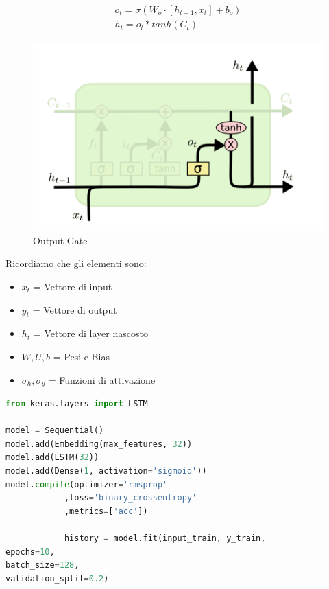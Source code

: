 \begin{itemize}
          \begin{equation}
              \begin{aligned}
                  o_t = \sigma(W_o \cdot [h_{t-1}, x_t] + b_o) \\
                  h_t = o_t * tanh(C_t)
              \end{aligned}
          \end{equation}
          \begin{figure}[H]
              \begin{center}
                  \includegraphics[scale=0.8]{images/outputgate.png}
              \end{center}
              \caption{Output Gate}
          \end{figure}

\end{itemize}

Ricordiamo che gli elementi sono:
\begin{itemize}
    \item $x_t$ = Vettore di input
    \item $y_t$ = Vettore di output
    \item $h_t$ = Vettore di layer nascosto
    \item $W,U,b$ = Pesi e Bias
    \item $\sigma_h, \sigma_y$ = Funzioni di attivazione
\end{itemize}

\begin{lstlisting}[language=python]
from keras.layers import LSTM

model = Sequential()
model.add(Embedding(max_features, 32))
model.add(LSTM(32))
model.add(Dense(1, activation='sigmoid'))
model.compile(optimizer='rmsprop'
            ,loss='binary_crossentropy'
            ,metrics=['acc'])

            history = model.fit(input_train, y_train,
epochs=10,
batch_size=128,
validation_split=0.2)
\end{lstlisting}

\newpage